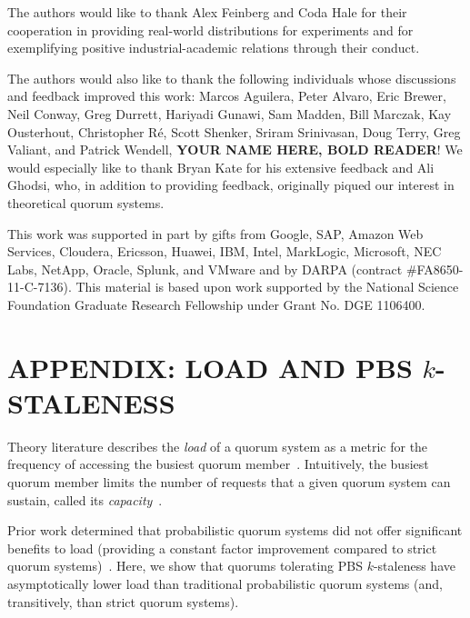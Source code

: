 \documentclass{vldb}
\newcommand{\sectionskip}{-0em}
\begin{document}
The authors would like to thank Alex Feinberg and Coda Hale for their
cooperation in providing real-world distributions for experiments and for
exemplifying positive industrial-academic relations through their conduct.

The authors would also like to thank the following individuals whose
discussions and feedback improved this work: Marcos Aguilera, Peter
Alvaro, Eric Brewer, Neil Conway, Greg Durrett, Hariyadi Gunawi, Sam
Madden, Bill Marczak, Kay Ousterhout, Christopher R\'e, Scott Shenker,
Sriram Srinivasan, Doug Terry, Greg Valiant, and Patrick Wendell,
\textbf{YOUR NAME HERE, BOLD READER}!  We would especially like to
thank Bryan Kate for his extensive feedback and Ali Ghodsi, who, in
addition to providing feedback, originally piqued our interest in
theoretical quorum systems.

This work was supported in part by gifts from Google, SAP,
Amazon Web Services, Cloudera, Ericsson, Huawei, IBM, Intel,
MarkLogic, Microsoft, NEC Labs, NetApp, Oracle, Splunk, and VMware and
by DARPA (contract \#FA8650-11-C-7136).  This material is based upon
work supported by the National Science Foundation Graduate Research
Fellowship under Grant No. DGE 1106400.

\balance

{\small


}

\vspace{\sectionskip}
\section*{APPENDIX: LOAD AND PBS {\large$k$}-STALENESS}
Theory literature describes the \textit{load} of a quorum system as a
metric for the frequency of accessing the busiest quorum
member~\cite[Definition 3.2]{quorumsystems}.  Intuitively, the busiest
quorum member limits the number of requests that a given quorum system
can sustain, called its \textit{capacity}~\cite[Corollary
  3.9]{quorumsystems}.

Prior work determined that probabilistic quorum systems did not offer
significant benefits to load (providing a constant factor improvement
compared to strict quorum systems)~\cite{prob-quorum}.  Here, we show
that quorums tolerating PBS $k$-staleness have asymptotically lower
load than traditional probabilistic quorum systems (and, transitively,
than strict quorum systems).
\end{document}
